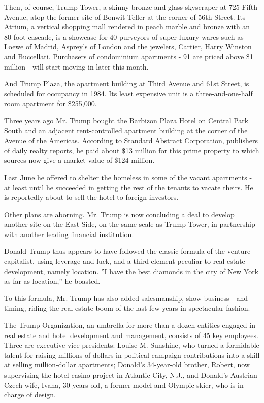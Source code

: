 Then, of course, Trump Tower, a skinny bronze and glass skyscraper at
725 Fifth Avenue, atop the former site of Bonwit Teller at the corner of
56th Street. Its Atrium, a vertical shopping mall rendered in peach
marble and bronze with an 80-foot cascade, is a showcase for 40
purveyors of super luxury wares such as Loewe of Madrid, Asprey's of
London and the jewelers, Cartier, Harry Winston and Buccellati.
Purchasers of condominium apartments - 91 are priced above \$1 million -
will start moving in later this month.

And Trump Plaza, the apartment building at Third Avenue and 61st Street,
is scheduled for occupancy in 1984. Its least expensive unit is a
three-and-one-half room apartment for \$255,000.

Three years ago Mr. Trump bought the Barbizon Plaza Hotel on Central
Park South and an adjacent rent-controlled apartment building at the
corner of the Avenue of the Americas. According to Standard Abstract
Corporation, publishers of daily realty reports, he paid about \$13
million for this prime property to which sources now give a market value
of \$124 million.

Last June he offered to shelter the homeless in some of the vacant
apartments - at least until he succeeded in getting the rest of the
tenants to vacate theirs. He is reportedly about to sell the hotel to
foreign investors.

Other plans are aborning. Mr. Trump is now concluding a deal to develop
another site on the East Side, on the same scale as Trump Tower, in
partnership with another leading financial institution.

Donald Trump thus appears to have followed the classic formula of the
venture capitalist, using leverage and luck, and a third element
peculiar to real estate development, namely location. ''I have the best
diamonds in the city of New York as far as location,'' he boasted.

To this formula, Mr. Trump has also added salesmanship, show business -
and timing, riding the real estate boom of the last few years in
spectacular fashion.

The Trump Organization, an umbrella for more than a dozen entities
engaged in real estate and hotel development and management, consists of
45 key employees. Three are executive vice presidents: Louise M.
Sunshine, who turned a formidable talent for raising millions of dollars
in political campaign contributions into a skill at selling
million-dollar apartments; Donald's 34-year-old brother, Robert, now
supervising the hotel casino project in Atlantic City, N.J., and
Donald's Austrian-Czech wife, Ivana, 30 years old, a former model and
Olympic skier, who is in charge of design.


